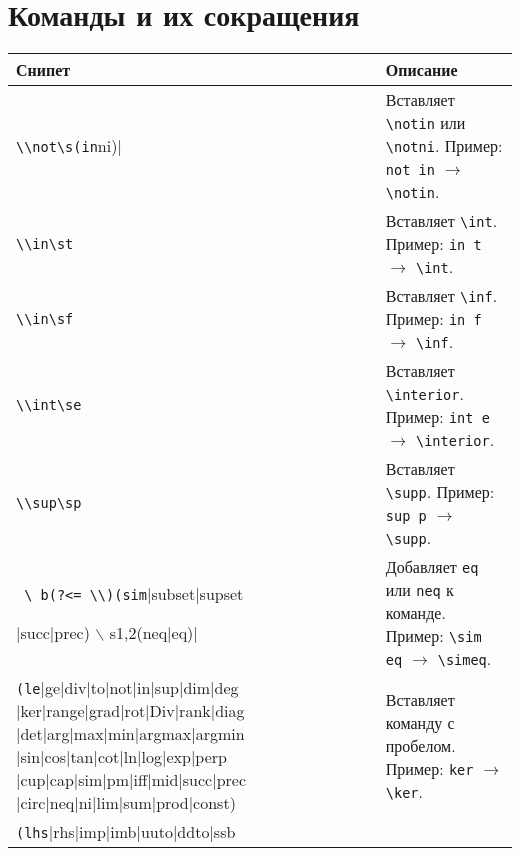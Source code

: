 \documentclass[a4paper]{article}
\begin{document}
\section{Команды и их сокращения}
\begin{longtable}{|p{5cm}|p{10cm}|}
    \hline
    \textbf{Снипет} & \textbf{Описание} \\
    \hline
    \verb|\\not\s(in|ni)| & Вставляет \verb|\notin| или \verb|\notni|. Пример: \verb|not in| $\rightarrow$ \verb|\notin|. \\
    \hline
    \verb|\\in\st| & Вставляет \verb|\int|. Пример: \verb|in t| $\rightarrow$ \verb|\int|. \\
    \hline
    \verb|\\in\sf| & Вставляет \verb|\inf|. Пример: \verb|in f| $\rightarrow$ \verb|\inf|. \\
    \hline
    \verb|\\int\se| & Вставляет \verb|\interior|. Пример: \verb|int e| $\rightarrow$ \verb|\interior|. \\
    \hline
    \verb|\\sup\sp| & Вставляет \verb|\supp|. Пример: \verb|sup p| $\rightarrow$ \verb|\supp|. \\
    \hline
    \verb| \ b(?<= \\)(sim||subset|supset
    
    |succ|prec) \( \backslash \) s{1,2}(neq|eq)| & Добавляет \verb|eq| или \verb|neq| к команде. Пример: \verb|\sim eq| $\rightarrow$ \verb|\simeq|. \\
    \hline
    \verb|(le||ge|div|to|not|in|sup|dim|deg
    |ker|range|grad|rot|Div|rank|diag
    |det|arg|max|min|argmax|argmin
    |sin|cos|tan|cot|ln|log|exp|perp
    |cup|cap|sim|pm|iff|mid|succ|prec
    |circ|neq|ni|lim|sum|prod|const) & Вставляет команду с пробелом. Пример: \verb|ker| $\rightarrow$ \verb|\ker|. \\
    \hline
    \verb|(lhs||rhs|imp|imb|uuto|ddto|ssb
    

\end{longtable}
\end{document}
